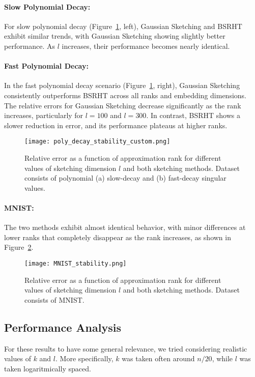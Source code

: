 \documentclass[a4paper, 12pt,oneside]{article}
\begin{document}
\paragraph{Slow Polynomial Decay:}
For slow polynomial decay (Figure~\ref{fig:poly_decay}, left), Gaussian Sketching and BSRHT exhibit similar trends, with Gaussian Sketching showing slightly better performance. As \( l \) increases, their performance becomes nearly identical.

\paragraph{Fast Polynomial Decay:}
In the fast polynomial decay scenario (Figure~\ref{fig:poly_decay}, right), Gaussian Sketching consistently outperforms BSRHT across all ranks and embedding dimensions. The relative errors for Gaussian Sketching decrease significantly as the rank increases, particularly for \( l = 100 \) and \( l = 300 \). In contrast, BSRHT shows a slower reduction in error, and its performance plateaus at higher ranks.

\begin{figure}[H]
\centering
\texttt{[image: poly\_decay\_stability\_custom.png]}
\caption{Relative error as a function of approximation rank for different values of sketching dimension \( l \) and both sketching methods. Dataset consists of polynomial (a) slow-decay and (b) fast-decay singular values.}
\label{fig:poly_decay}
\end{figure}

\paragraph{MNIST:}
The two methods exhibit almost identical behavior, with minor differences at lower ranks that completely disappear as the rank increases, as shown in Figure~\ref{fig:mnist_decay}.

\begin{figure}[H]
\centering
\texttt{[image: MNIST\_stability.png]}
\caption{Relative error as a function of approximation rank for different values of sketching dimension \( l \) and both sketching methods. Dataset consists of MNIST.}
\label{fig:mnist_decay}
\end{figure}
\subsection{Performance Analysis}
		For these results to have some general relevance, we tried considering realistic values of $k$ and $l$. More specifically, $k$ was taken often around $n/20$, while $l$ was taken logaritmically spaced.
	
\end{document}
